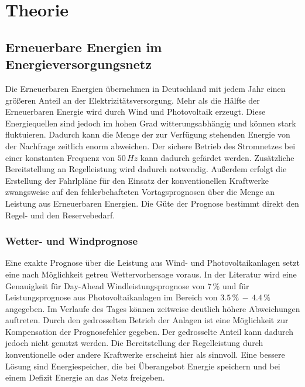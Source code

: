 \chapter{Theorie}
\label{chap:theorie}
\minitoc


\section{Erneuerbare Energien im Energieversorgungsnetz}

Die Erneuerbaren Energien \"ubernehmen in Deutschland mit jedem Jahr einen
gr\"o\ss eren Anteil an der Elektrizit\"atsversorgung. Mehr als die H\"alfte der
Erneuerbaren Energie wird durch Wind und Photovoltaik erzeugt. Diese
Energiequellen sind jedoch im hohen Grad witterungsabh\"angig und k\"onnen stark
fluktuieren. Dadurch kann die Menge der zur Verf\"ugung stehenden Energie von
der Nachfrage zeitlich enorm abweichen. Der sichere Betrieb des Stromnetzes bei
einer konstanten Frequenz von $50\,Hz$ kann dadurch gef\"ardet werden.
Zus\"atzliche Bereitstellung an Regelleistung wird dadurch notwendig. Au\ss erdem erfolgt die
Erstellung der Fahrlpl\"ane f\"ur den Einsatz der konventionellen Kraftwerke
zwangsweise auf den fehlerbehafteten Vortagsprognosen \"uber die Menge an
Leistung aus Erneuerbaren Energien.  Die G\"ute der Prognose bestimmt direkt den
Regel- und den Reservebedarf.


\subsection*{Wetter- und Windprognose}

Eine exakte Prognose \"uber die Leistung aus Wind- und Photovoltaikanlagen setzt
eine nach M\"oglichkeit getreu Wettervorhersage voraus. In der Literatur wird
eine Genauigkeit f\"ur Day-Ahead Windleistungsprognose von $7\,\%$
\cite{prognose_doctor} und f\"ur Leistungsprognose aus Photovoltaikanlagen im
Bereich von $3.5\,\%\,-\,4.4\,\%$ \cite{solarvorhersagung} angegeben. Im
Verlaufe des Tages k\"onnen zeitweise deutlich h\"ohere Abweichungen auftreten.
Durch den gedrosselten Betrieb der Anlagen ist eine M\"oglichkeit zur
Kompensation der Prognosefehler gegeben. Der gedrosselte Anteil kann dadurch
jedoch nicht genutzt werden. Die Bereitstellung der Regelleistung durch
konventionelle oder andere Kraftwerke erscheint hier als sinnvoll. Eine bessere
L\"osung sind Energiespeicher, die bei \"Uberangebot Energie speichern und bei
einem Defizit Energie an das Netz freigeben.

